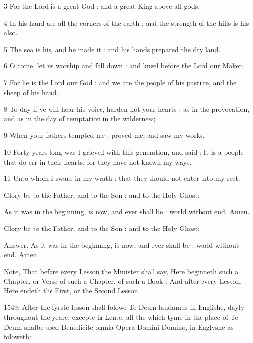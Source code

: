 3 For the Lord is a great God : and a great King above all gods.

4 In his hand are all the corners of the earth : and the strength of the hills is his also.

5 The sea is his, and he made it : and his hands prepared the dry land.

6 O come, let us worship and fall down : and kneel before the Lord our Maker.

7 For he is the Lord our God : and we are the people of his pasture, and the sheep of his hand.

8 To day if ye will hear his voice, harden not your hearts : as in the provocation, and as in the day of temptation in the wilderness;

9 When your fathers tempted me : proved me, and saw my works.

10 Forty years long was I grieved with this generation, and said : It is a people that do err in their hearts, for they have not known my ways.

11 Unto whom I sware in my wrath : that they should not enter into my rest.

Glory be to the Father, and to the Son : and to the Holy Ghost;

As it was in the beginning, is now, and ever shall be : world without end. Amen.

Glory be to the Father, and to the Son : and to the Holy Ghost;

Answer. As it was in the beginning, is now, and ever shall be : world without end. Amen.


Note, That before every Lesson the Minister shall say, Here beginneth such a Chapter, or Verse of such a Chapter, of such a Book : And after every Lesson, Here endeth the First, or the Second Lesson.

1549: After the fyrste lesson shall folowe Te Deum laudamus in Englishe, dayly throughout the yeare, excepte in Lente, all the which tyme in the place of Te Deum shalbe used Benedicite omnia Opera Domini Domino, in Englyshe as foloweth:

